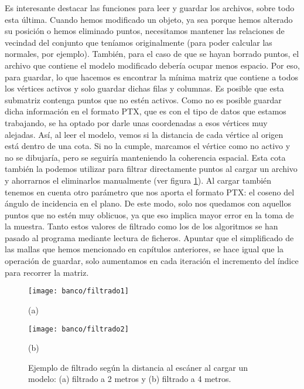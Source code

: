 Es interesante destacar las funciones para leer y guardar los archivos, sobre todo esta última. Cuando hemos modificado un objeto, ya sea porque hemos alterado su posición o hemos eliminado puntos, necesitamos mantener las relaciones de vecindad del conjunto que teníamos originalmente (para poder calcular las normales, por ejemplo). También, para el caso de que se hayan borrado puntos, el archivo que contiene el modelo modificado debería ocupar menos espacio. Por eso, para guardar, lo que hacemos es encontrar la mínima matriz que contiene a todos los vértices activos y solo guardar dichas filas y columnas. Es posible que esta submatriz contenga puntos que no estén activos. Como no es posible guardar dicha información en el formato PTX, que es con el tipo de datos que estamos trabajando, se ha optado por darle unas coordenadas a esos vértices muy alejadas. Así, al leer el modelo, vemos si la distancia de cada vértice al origen está dentro de una cota. Si no la cumple, marcamos el vértice como no activo y no se dibujaría, pero se seguiría manteniendo la coherencia espacial. Esta cota también la podemos utilizar para filtrar directamente puntos al cargar un archivo y ahorrarnos el eliminarlos manualmente (ver figura \ref{fig:filtrado}). Al cargar también tenemos en cuenta otro parámetro que nos aporta el formato PTX: el coseno del ángulo de incidencia en el plano. De este modo, solo nos quedamos con aquellos puntos que no estén muy oblicuos, ya que eso implica mayor error en la toma de la muestra. Tanto estos valores de filtrado como los de los algoritmos se han pasado al programa mediante lectura de ficheros. Apuntar que el simplificado de las mallas  que hemos mencionado en capítulos anteriores, se hace igual que la operación de guardar, solo aumentamos en cada iteración el incremento del índice para recorrer la matriz.  \\

\begin{figure}[h!]
	\begin{minipage}{0.5\textwidth}
		\centering
		\texttt{[image: banco/filtrado1]} 
		\caption*{(a)}
	\end{minipage}
	\begin{minipage}{0.5\textwidth}
		\centering
		\texttt{[image: banco/filtrado2]} 
		\caption*{(b)}
	\end{minipage}
	\caption{Ejemplo de filtrado según la distancia al escáner al cargar un modelo: (a) filtrado a 2 metros y (b) filtrado a 4 metros.}
	\label{fig:filtrado}
\end{figure}

